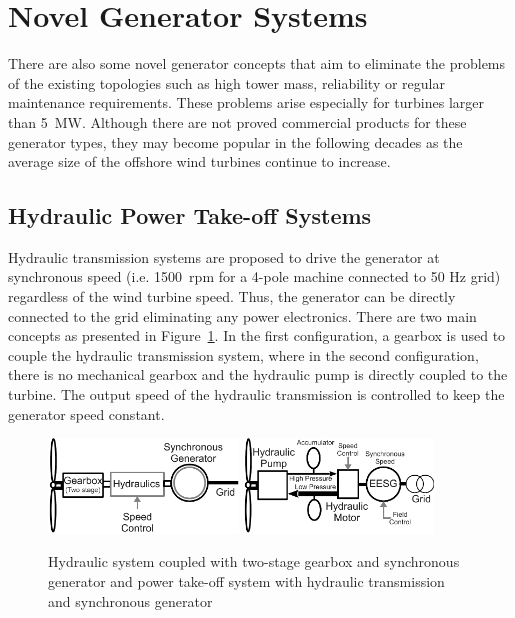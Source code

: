 \documentclass[a4paper, 11pt]{article} %
\begin{document}
\section{Novel Generator Systems}

There are also some novel generator concepts that aim to eliminate the problems of the existing topologies such as high tower mass, reliability or regular maintenance requirements. These problems arise especially for turbines larger than 5~MW. Although there are not proved commercial products for these generator types, they may become popular in the following decades as the average size of the offshore wind turbines continue to increase.

\subsection{Hydraulic Power Take-off Systems}

Hydraulic transmission systems are proposed to drive the generator at synchronous speed (i.e. 1500~rpm for a 4-pole machine connected to 50 Hz grid) regardless of the wind turbine speed. Thus, the generator can be directly connected to the grid eliminating any power electronics. There are two main concepts as presented in Figure~\ref{hydraulics}. In the first configuration, a gearbox is used to couple the hydraulic transmission system, where in the second configuration, there is no mechanical gearbox and the hydraulic pump is directly coupled to the turbine. The output speed of the hydraulic transmission is controlled to keep the generator speed constant.

  \begin{figure}
    \centering
    \includegraphics[width=0.45\textwidth]{hydraulics}
    \hfill
    \includegraphics[width=0.45\textwidth]{EESG_hydraulics}
    \caption{Hydraulic system coupled with two-stage gearbox and synchronous generator and power take-off system with hydraulic transmission and synchronous generator } 
    \label{hydraulics}
  \end{figure}
\end{document}
